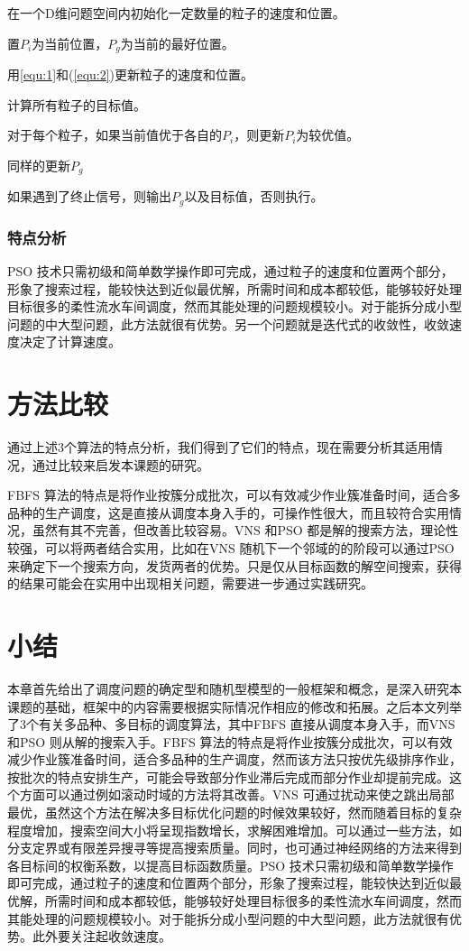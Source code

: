 \begin{asparaenum}
\renewcommand{\labelenumi}{\heiti 步骤\theenumi~}
\item 在一个D维问题空间内初始化一定数量的粒子的速度和位置。
\item 置$P_i$为当前位置，$P_g$为当前的最好位置。
\item 用\eqref{equ:1}和(\ref{equ:2})更新粒子的速度和位置。
\item 计算所有粒子的目标值。
\item 对于每个粒子，如果当前值优于各自的$P_i$，则更新$P_i$为较优值。
\item 同样的更新$P_g$
\item 如果遇到了终止信号，则输出$P_g$以及目标值，否则执行。
\end{asparaenum}

\subsubsection{特点分析}
PSO 技术只需初级和简单数学操作即可完成，通过粒子的速度和位置两个部分，形象了搜索过程，能较快达到近似最优解，所需时间和成本都较低，能够较好处理目标很多的柔性流水车间调度，然而其能处理的问题规模较小。对于能拆分成小型问题的中大型问题，此方法就很有优势。另一个问题就是迭代式的收敛性，收敛速度决定了计算速度。
\section{方法比较}
通过上述3个算法的特点分析，我们得到了它们的特点，现在需要分析其适用情况，通过比较来启发本课题的研究。

FBFS 算法的特点是将作业按簇分成批次，可以有效减少作业簇准备时间，适合多品种的生产调度，这是直接从调度本身入手的，可操作性很大，而且较符合实用情况，虽然有其不完善，但改善比较容易。VNS 和PSO 都是解的搜索方法，理论性较强，可以将两者结合实用，比如在VNS 随机下一个邻域的的阶段可以通过PSO 来确定下一个搜索方向，发货两者的优势。只是仅从目标函数的解空间搜索，获得的结果可能会在实用中出现相关问题，需要进一步通过实践研究。

\section{小结}
本章首先给出了调度问题的确定型和随机型模型的一般框架和概念，是深入研究本课题的基础，框架中的内容需要根据实际情况作相应的修改和拓展。之后本文列举了3个有关多品种、多目标的调度算法，其中FBFS 直接从调度本身入手，而VNS 和PSO 则从解的搜索入手。FBFS 算法的特点是将作业按簇分成批次，可以有效减少作业簇准备时间，适合多品种的生产调度，然而该方法只按优先级排序作业，按批次的特点安排生产，可能会导致部分作业滞后完成而部分作业却提前完成。这个方面可以通过例如滚动时域的方法将其改善。VNS 可通过扰动来使之跳出局部最优，虽然这个方法在解决多目标优化问题的时候效果较好，然而随着目标的复杂程度增加，搜索空间大小将呈现指数增长，求解困难增加。可以通过一些方法，如分支定界或有限差异搜寻等提高搜索质量。同时，也可通过神经网络的方法来得到各目标间的权衡系数，以提高目标函数质量。PSO 技术只需初级和简单数学操作即可完成，通过粒子的速度和位置两个部分，形象了搜索过程，能较快达到近似最优解，所需时间和成本都较低，能够较好处理目标很多的柔性流水车间调度，然而其能处理的问题规模较小。对于能拆分成小型问题的中大型问题，此方法就很有优势。此外要关注起收敛速度。